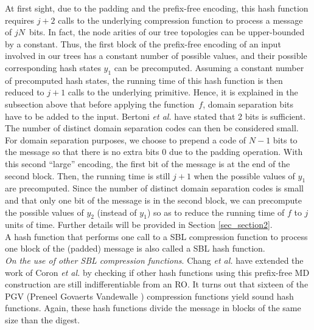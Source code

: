 \documentclass{llncs}
\renewcommand{\paragraph}[1]{\noindent\textit{#1}.}
\begin{document}
At first sight, due to the padding and the prefix-free encoding, this hash function requires $j+2$ calls to the underlying compression function 
to process a message of $jN$~bits. In fact, the node arities of our tree topologies can be upper-bounded by a constant. Thus, the first block of
the prefix-free encoding of an input involved in our trees has a constant number of possible values, and their possible corresponding hash states 
$y_1$ can be precomputed. Assuming a constant number of precomputed hash states, the running time of this hash function is then reduced to $j+1$
calls to the underlying primitive. Hence, it is explained in the subsection above that before applying the function~$f$, domain
separation bits have to be added to the input. Bertoni \emph{et al.} \cite{BDPV14_Suf} have stated that 2 bits is sufficient. 
The number of distinct 
domain separation codes can then be considered small.
For domain separation purposes, we choose to prepend a code of $N-1$ bits to the message 
so that there is no extra bits $0$ due to the padding operation. With this second ``large'' encoding, the first bit of 
the message is at the end of the second block. Then, the running time is still $j+1$ when the possible values of
$y_1$ are precomputed. Since the number of distinct domain separation codes is small and that only one bit of the message is in the second block, 
we can precompute the possible values of $y_2$ (instead of $y_1$)
so as to reduce the running time of $f$ to $j$ units of time. Further details will be provided in Section \ref{sec_section2}.
~\\

A hash function that performs one call to a SBL compression function to process one block of the (padded) message is also called a SBL hash function.~\\



\paragraph{On the use of other SBL compression functions}
Chang \emph{et al.} \cite{CLNY06} have extended the work of Coron \emph{et al.} by checking if other 
hash functions using this prefix-free MD construction are still indifferentiable from an RO.
It turns out that sixteen of the PGV (Preneel Govaerts Vandewalle \cite{PGV93}) compression functions yield sound hash functions.
Again, these hash functions divide the message in blocks of the same size than the digest.~\\
\end{document}
